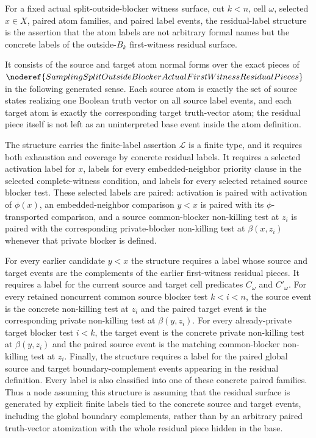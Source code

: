 \begin{definition}
For a fixed actual split-outside-blocker witness surface, cut \(k<n\), cell
\(\omega\), selected \(x\in X\), paired atom families, and paired label
events, the residual-label structure is the assertion that the atom labels
are not arbitrary formal names but the concrete labels of the outside-\(B_k\)
first-witness residual surface.

It consists of the source and target atom normal forms over the exact pieces
of \(\noderef{SamplingSplitOutsideBlockerActualFirstWitnessResidualPieces}\)
in the following generated sense.  Each source atom is exactly the set of
source states realizing one Boolean truth vector on all source label events,
and each target atom is exactly the corresponding target truth-vector atom;
the residual piece itself is not left as an uninterpreted base event inside
the atom definition.

The structure carries the finite-label assertion \(\mathcal L\) is a finite
type, and it requires both exhaustion and coverage by concrete residual
labels.  It requires a selected activation label for \(x\), labels for every
embedded-neighbor priority clause in the selected complete-witness condition,
and labels for every selected retained source blocker test.  These selected
labels are paired: activation is paired with activation of \(\phi(x)\), an
embedded-neighbor comparison \(y<x\) is paired with its \(\phi\)-transported
comparison, and a source common-blocker non-killing test at \(z_i\) is paired
with the corresponding private-blocker non-killing test at
\(\beta(x,z_i)\) whenever that private blocker is defined.

For every earlier candidate \(y<x\) the structure requires a label whose
source and target events are the complements of the earlier first-witness
residual pieces.  It requires a label for the current source and target cell
predicates \(C_\omega\) and \(C'_\omega\).  For every retained noncurrent
common source blocker test \(k<i<n\), the source event is the concrete
non-killing test at \(z_i\) and the paired target event is the corresponding
private non-killing test at \(\beta(y,z_i)\).  For every already-private
target blocker test \(i<k\), the target event is the concrete private
non-killing test at \(\beta(y,z_i)\) and the paired source event is the
matching common-blocker non-killing test at \(z_i\).  Finally, the structure
requires a label for the paired global source and target boundary-complement
events appearing in the residual definition.  Every label is also classified
into one of these concrete paired families.  Thus a node assuming this
structure is assuming that the residual surface is generated by explicit
finite labels tied to the concrete source and target events, including the
global boundary complements, rather than by an arbitrary paired truth-vector
atomization with the whole residual piece hidden in the base.
\end{definition}
